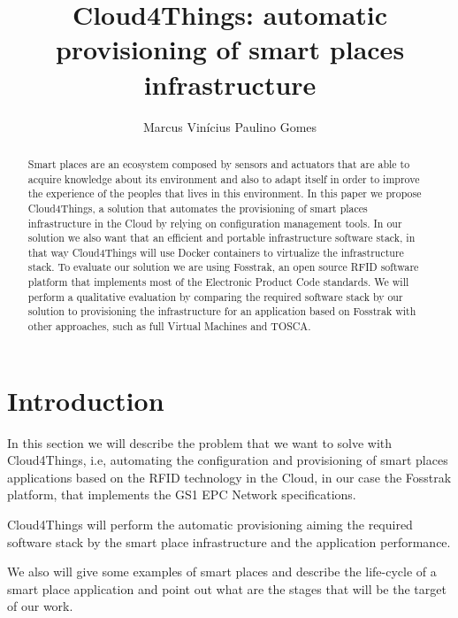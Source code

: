 \documentclass{../llncs2e/llncs}
\title{Cloud4Things: automatic provisioning of smart places infrastructure}
\author{\Large Marcus Vin\'icius Paulino Gomes}
\institute{\large T\'ecnico Lisboa, Universidade T\'ecnica de Lisboa\\
 \email{\{marcus.paulino.gomes\}@tecnico.ulisboa.pt}}
\begin{document}
\maketitle
\begin{abstract}
Smart places are an ecosystem composed by sensors and actuators that are able to acquire knowledge
about its environment and also to adapt itself in order to improve the experience of the peoples
that lives in this environment. In this paper we propose Cloud4Things, a solution that automates
the provisioning of smart places infrastructure in the Cloud by relying on configuration management
tools. In our solution we also want that an efficient and portable infrastructure software stack,
in that way Cloud4Things will use Docker containers to virtualize the infrastructure stack. To
evaluate our solution we are using Fosstrak, an open source RFID software platform that implements
most of the Electronic Product Code standards. We will perform a qualitative evaluation by comparing
the required software stack by our solution to provisioning the infrastructure for an application
based on Fosstrak with other approaches, such as full Virtual Machines and TOSCA.
\end{abstract}
\section{Introduction}
\label{sec:introduction}
In this section we will describe the problem that we want to solve with Cloud4Things, i.e, automating
the configuration and provisioning of smart places applications based on the RFID technology in the
Cloud, in our case the Fosstrak platform, that implements the GS1 EPC Network specifications.

Cloud4Things will perform the automatic provisioning aiming the required software stack by the smart
place infrastructure and the application performance.

We also will give some examples of smart places and describe the life-cycle of a smart place
application and point out what are the stages that will be the target of our work.
\end{document}
